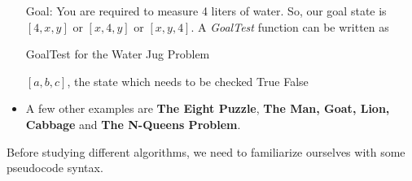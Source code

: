 \documentclass[a4paper]{article}
\begin{document}
\begin{itemize}
    Goal: You are required to measure 4 liters of water. So, our goal state is $[4,x,y]$ or $[x,4,y]$ or $[x,y,4]$. A \textit{GoalTest} function can be written as
    \begin{algorithm}[H]
    \caption{GoalTest for the Water Jug Problem}\label{alg:AI-goal-test-water-jug}
        \begin{algorithmic}[1]
            \Require $[a,b,c]$, the state which needs to be checked
                \State \Return True
            \EndIf
            \State \Return False
        \end{algorithmic}
    \end{algorithm}
    \item A few other examples are \textbf{The Eight Puzzle}, \textbf{The Man, Goat, Lion, Cabbage} and \textbf{The N-Queens Problem}.
\end{itemize}
Before studying different algorithms, we need to familiarize ourselves with some pseudocode syntax.
\end{document}
